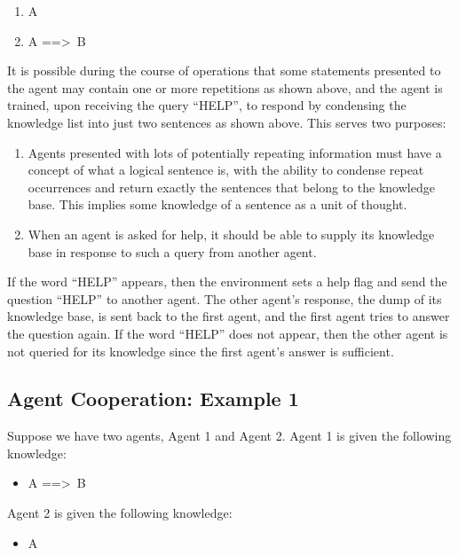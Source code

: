 \documentclass{article}
\begin{document}
\begin{enumerate}
	\item A
	\item A ==\textgreater \, B
\end{enumerate}

It is possible during the course of operations that some statements presented to the agent may contain one or more repetitions as shown above, and the agent is trained, upon receiving the query ``HELP'', to respond by condensing the knowledge list into just two sentences as shown above. This serves two purposes:

\begin{enumerate}
	\item Agents presented with lots of potentially repeating information must have a concept of what a logical sentence is, with the ability to condense repeat occurrences and return exactly the sentences that belong to the knowledge base. This implies some knowledge of a sentence as a unit of thought.
	\item When an agent is asked for help, it should be able to supply its knowledge base in response to such a query from another agent.
\end{enumerate}

If the word ``HELP'' appears, then the environment sets a help flag and send the question ``HELP'' to another agent. The other agent's response, the dump of its knowledge base, is sent back to the first agent, and the first agent tries to answer the question again. If the word ``HELP'' does not appear, then the other agent is not queried for its knowledge since the first agent's answer is sufficient.

\subsection{Agent Cooperation: Example 1}
\label{example_1}

Suppose we have two agents, Agent 1 and Agent 2. Agent 1 is given the following knowledge:

\begin{itemize}
	\item A ==\textgreater \, B
\end{itemize}

Agent 2 is given the following knowledge:

\begin{itemize}
	\item A
\end{itemize}
\end{document}
